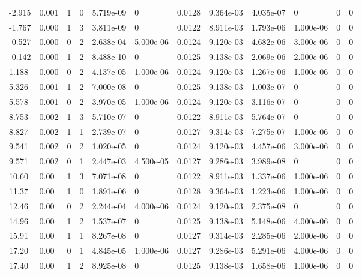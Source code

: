 \documentclass[preview]{standalone}
\begin{document}
{{\begin{tabular}{L{1.2cm}C{1.2cm} C{0.3cm}C{0.5cm} C{1.4cm}C{1.4cm} C{1.4cm}C{1.4cm} C{1.6cm}C{1.6cm} C{1.6cm}C{1.6cm}}
  -2.915  &  0.001  & 1     &  0 &  5.719e-09  & 0  &  0.0128&   9.364e-03& 4.035e-07 & 0   &  0 & 0  \\ 
  -1.767  &  0.000  & 1     &  3 &  3.811e-09  & 0  &  0.0122&   8.911e-03& 1.793e-06 & 1.000e-06   &  0 & 0  \\ 
  -0.527  &  0.000  & 0     &  2 &  2.638e-04  & 5.000e-06  &  0.0124&   9.120e-03& 4.682e-06 & 3.000e-06   &  0 & 0  \\ 
  -0.142  &  0.000  & 1     &  2 &  8.488e-10  & 0  &  0.0125&   9.138e-03& 2.069e-06 & 2.000e-06   &  0 & 0  \\ 
  1.188  &  0.000  & 0     &  2 &  4.137e-05  & 1.000e-06  &  0.0124&   9.120e-03& 1.267e-06 & 1.000e-06   &  0 & 0  \\ 
  5.326  &  0.001  & 1     &  2 &  7.000e-08  & 0  &  0.0125&   9.138e-03& 1.003e-07 & 0   &  0 & 0  \\ 
  5.578  &  0.001  & 0     &  2 &  3.970e-05  & 1.000e-06  &  0.0124&   9.120e-03& 3.116e-07 & 0   &  0 & 0  \\ 
  8.753  &  0.002  & 1     &  3 &  5.710e-07  & 0  &  0.0122&   8.911e-03& 5.764e-07 & 0   &  0 & 0  \\ 
  8.827  &  0.002  & 1     &  1 &  2.739e-07  & 0  &  0.0127&   9.314e-03& 7.275e-07 & 1.000e-06   &  0 & 0  \\ 
  9.541  &  0.002  & 0     &  2 &  1.020e-05  & 0  &  0.0124&   9.120e-03& 4.457e-06 & 3.000e-06   &  0 & 0  \\ 
  9.571  &  0.002  & 0     &  1 &  2.447e-03  & 4.500e-05  &  0.0127&   9.286e-03& 3.989e-08 & 0   &  0 & 0  \\ 
  10.60  &  0.00  & 1     &  3 &  7.071e-08  & 0  &  0.0122&   8.911e-03& 1.337e-06 & 1.000e-06   &  0 & 0  \\ 
  11.37  &  0.00  & 1     &  0 &  1.891e-06  & 0  &  0.0128&   9.364e-03& 1.223e-06 & 1.000e-06   &  0 & 0  \\ 
  12.46  &  0.00  & 0     &  2 &  2.244e-04  & 4.000e-06  &  0.0124&   9.120e-03& 2.375e-08 & 0   &  0 & 0  \\ 
  14.96  &  0.00  & 1     &  2 &  1.537e-07  & 0  &  0.0125&   9.138e-03& 5.148e-06 & 4.000e-06   &  0 & 0  \\ 
  15.91  &  0.00  & 1     &  1 &  8.267e-08  & 0  &  0.0127&   9.314e-03& 2.285e-06 & 2.000e-06   &  0 & 0  \\ 
  17.20  &  0.00  & 0     &  1 &  4.845e-05  & 1.000e-06  &  0.0127&   9.286e-03& 5.291e-06 & 4.000e-06   &  0 & 0  \\ 
  17.40  &  0.00  & 1     &  2 &  8.925e-08  & 0  &  0.0125&   9.138e-03& 1.658e-06 & 1.000e-06   &  0 & 0  \\ 

\end{tabular}}}
\end{document}
